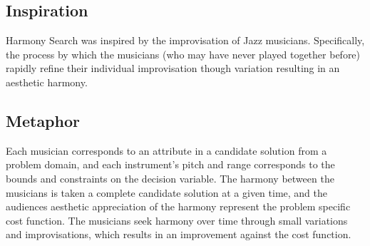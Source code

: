 \subsection{Inspiration}
Harmony Search was inspired by the improvisation of Jazz musicians. Specifically, the process by which the musicians (who may have never played together before) rapidly refine their individual improvisation though variation resulting in an aesthetic harmony.  


\subsection{Metaphor}
Each musician corresponds to an attribute in a candidate solution from a problem domain, and each instrument's pitch and range corresponds to the bounds and constraints on the decision variable. The harmony between the musicians is taken a complete candidate solution at a given time, and the audiences aesthetic appreciation of the harmony represent the problem specific cost function. The musicians seek harmony over time through small variations and improvisations, which results in an improvement against the cost function.


